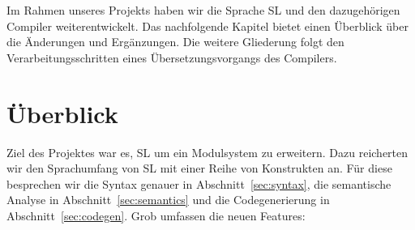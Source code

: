 \documentclass[runningheads]{llncs}
\begin{document}
Im Rahmen unseres Projekts haben wir die Sprache SL und den dazugehörigen Compiler weiterentwickelt. Das nachfolgende Kapitel bietet einen Überblick über die Änderungen und Ergänzungen. Die weitere Gliederung folgt den Verarbeitungsschritten eines Übersetzungsvorgangs des Compilers.

\section{Überblick}

Ziel des Projektes war es, SL um ein Modulsystem zu erweitern. Dazu
reicherten wir den Sprachumfang von SL mit einer Reihe von Konstrukten an. Für
diese besprechen wir die Syntax genauer in Abschnitt~\ref{sec:syntax},
die semantische Analyse in Abschnitt~\ref{sec:semantics} und die
Codegenerierung in Abschnitt~\ref{sec:codegen}. Grob umfassen die neuen
Features:
\end{document}
